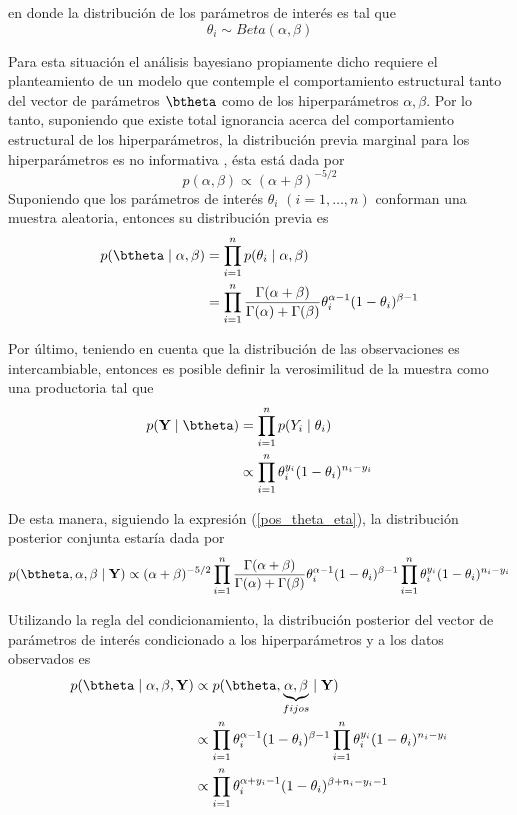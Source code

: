 en donde la distribución de los parámetros de interés es tal que
\begin{equation*}
\theta_i \sim Beta(\alpha, \beta)
\end{equation*}

Para esta situación el análisis bayesiano propiamente dicho requiere el planteamiento de un modelo que contemple el comportamiento estructural tanto del vector de parámetros $\btheta$ como de los hiperparámetros $\alpha, \beta$. Por lo tanto, suponiendo que existe total ignorancia acerca del comportamiento estructural de los hiperparámetros, la distribución previa marginal para los hiperparámetros es no informativa \cite{Gelman03}, ésta está dada por
\begin{equation*}
p(\alpha,\beta)\propto(\alpha+\beta)^{-5/2}
\end{equation*}
Suponiendo que los parámetros de interés $\theta_i$ $(i=1,\ldots,n)$ conforman una muestra aleatoria, entonces su distribución previa es
\begin{align*}
p(\btheta \mid \alpha, \beta)&=\prod_{i=1}^n p(\theta_i \mid \alpha, \beta)\\
&=\prod_{i=1}^n \frac{\Gamma(\alpha+\beta)}{\Gamma(\alpha)+\Gamma(\beta)}
\theta_i^{\alpha-1}(1-\theta_i)^{\beta-1}
\end{align*}

Por último, teniendo en cuenta que la distribución de las observaciones es intercambiable, entonces es posible definir la verosimilitud de la muestra como una productoria tal que
\begin{align*}
p(\mathbf{Y} \mid \btheta)&=\prod_{i=1}^n p(Y_i \mid \theta_i)\\
&\propto \prod_{i=1}^n \theta_i^{y_i}(1-\theta_i)^{n_i-y_i}
\end{align*}

De esta manera, siguiendo la expresión (\ref{pos_theta_eta}), la distribución posterior conjunta estaría dada por
\begin{equation*}
p(\btheta,\alpha,\beta \mid \mathbf{Y})\propto
(\alpha+\beta)^{-5/2}\prod_{i=1}^n \frac{\Gamma(\alpha+\beta)}{\Gamma(\alpha)+\Gamma(\beta)}
\theta_i^{\alpha-1}(1-\theta_i)^{\beta-1}\prod_{i=1}^n \theta_i^{y_i}(1-\theta_i)^{n_i-y_i}
\end{equation*}

Utilizando la regla del condicionamiento, la distribución posterior del vector de parámetros de interés condicionado a los hiperparámetros y a los datos observados es
\begin{align*}
p(\btheta \mid \alpha,\beta,\mathbf{Y})
&\propto p(\btheta,\underbrace{\alpha,\beta}_{fijos} \mid \mathbf{Y})\\
&\propto \prod_{i=1}^n \theta_i^{\alpha-1}(1-\theta_i)^{\beta-1}\prod_{i=1}^n \theta_i^{y_i}(1-\theta_i)^{n_i-y_i}\\
&\propto \prod_{i=1}^n \theta_i^{\alpha+y_i-1}(1-\theta_i)^{\beta+n_i-y_i-1}
\end{align*}

